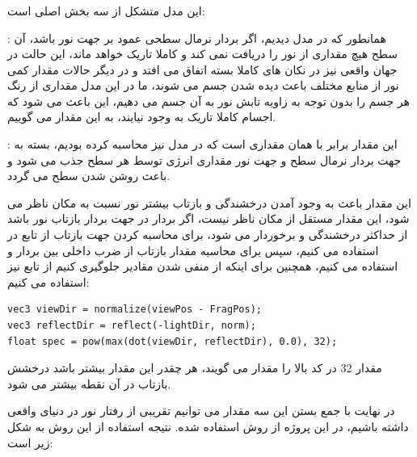 \documentclass[a4paper, 12pt]{book}
\newcommand{\lrbold}[1]{\lr{\textbf{#1}}}
\newcommand{\lrit}[1]{\lr{\textit{#1}}}
\begin{document}
    \subsubsection*{}
        این مدل متشکل از سه بخش اصلی است:\par
    \lrbold{ambient}:
    همانطور که در مدل  دیدیم، اگر بردار نرمال سطحی عمود بر جهت نور باشد، آن سطح هیچ مقداری از نور را دریافت نمی کند و کاملا تاریک خواهد ماند، این حالت در جهان واقعی نیز در نکان های کاملا بسته اتفاق می افتد و در دیگر حالات مقدار کمی نور از منابع مختلف باعث دیده شدن جسم می شوند، ما در این مدل مقداری از رنگ هر جسم را بدون توجه به زاویه تابش نور به آن جسم می دهیم، این باعث می شود که اجسام کاملا تاریک به وجود نیایند، به این مقدار  می گوییم.\par

    \lrbold{diffuse}:
    این مقدار برابر با همان مقداری است که در مدل  نیز محاسبه کرده بودیم، بسته به جهت بردار نرمال سطح و جهت نور مقداری انرژی توسط هر سطح جذب می شود و باعث روشن شدن سطح می گردد.\par

    \lrbold{specular}
    این مقدار باعث به وجود آمدن درخشندگی و بازتاب بیشتر نور نسبت به مکان ناظر می شود، این مقدار مستقل از مکان ناظر نیست، اگر بردار  در جهت بردار بازتاب نور باشد از حداکثر درخشندگی و  برخوردار می شود، برای محاسبه کردن جهت بازتاب از تابع  در  استفاده می کنیم، سپس برای محاسبه مقدار بازتاب از ضرب داخلی بین بردار  و  استفاده می کنیم، همچنین برای اینکه از منفی شدن مقادیر جلوگیری کنیم از تابع  نیز استفاده می کنیم:


    \begin{LTR}
    \small
        \begin{lstlisting}[style=C++Style,caption=\lrit{calculating specular component}]
vec3 viewDir = normalize(viewPos - FragPos);
vec3 reflectDir = reflect(-lightDir, norm);
float spec = pow(max(dot(viewDir, reflectDir), 0.0), 32);
        \end{lstlisting}
    \end{LTR}
    \normalsize
    \vspace*{0.3cm}

    مقدار 32 در کد بالا را مقدار  می گویند، هر چقدر این مقدار بیشتر باشد درخشش بازتاب در آن نقطه بیشتر می شود.\par
    در نهایت با جمع بستن این سه مقدار می توانیم تقریبی از رفتار نور در دنیای واقعی داشته باشیم، در این پروژه از روش  استفاده شده.
    نتیجه استفاده از این روش به شکل زیر است:
\end{document}
